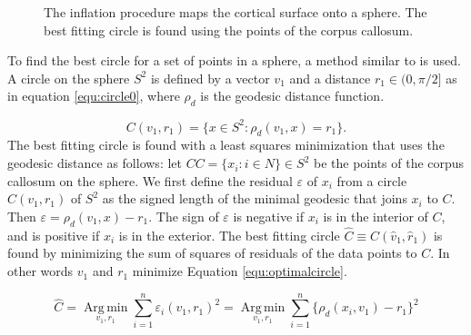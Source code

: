 \begin{figure} 
 \centering 
 \caption[Inflation procedure, mapping the cortex on a sphere.]{The inflation procedure maps the cortical surface onto a sphere. 
          The best fitting circle is found using the points of the corpus callosum.}
 \label{fig:Corpuscallosum}  
\end{figure}

To find the best circle for a set of points in a sphere, a method similar to \cite{jung_analysis_2012} is used.
A circle on the sphere $S^2$ is defined by a vector $v_1$ and a distance $r_1 \in (0, \pi/2]$ as in equation \ref{equ:circle0},
where $\rho_d$ is the geodesic distance function.

\begin{equation}  
	C(v_1, r_1) = \{x \in S^2 : \rho_d(v_1, x) = r_1\}.
  \label{equ:circle0}
\end{equation}
The best fitting circle is found with a least squares minimization
that uses the geodesic distance as follows:
let $CC = \{x_i: i \in N\} \in S^2$ be the points of the corpus callosum on the sphere. We first define the residual $\varepsilon$ of $x_i$ from a circle
$C( v_1 , r_1 )$ of $S^2$ as the signed length of the minimal geodesic that joins $x_i$ to $C$. Then 
$\varepsilon = \rho_d( v_1 , x ) - r_1$. The sign of $\varepsilon$ is negative if $x_i$ is in the interior of $C$, and is positive if $x_i$ is in the exterior.
The best fitting circle $\hat{C} \equiv C( \hat{v}_1 , \hat{r}_1 )$ 
is found by minimizing the sum of squares of residuals of the data points to $C$. 
In other words $v_1$ and $r_1$ minimize Equation \ref{equ:optimalcircle}.

\begin{equation}  
  \hat{C} = \operatorname*{Arg\,min}_{v_1, r_1} \sum_{i=1}^{n} \varepsilon_i ( v_1 , r_1 )^2 = \operatorname*{Arg\,min}_{v_1, r_1} \sum_{i=1}^{n}\{\rho_d(x_i, v_1) - r_1 \}^2
  \label{equ:optimalcircle}
\end{equation}


